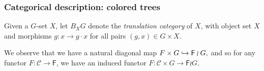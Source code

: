 \documentclass[a4paper,10pt
]{article}%
\renewcommand{\1}{\ensuremath{\mathbb{id}}}
\begin{document}
\subsubsection{Categorical description: colored trees}
\label{COMEGA_SEC}

\begin{definition}
      Given a $G$-set $X$, let $B_XG$ denote the \textit{translation category} of $X$,
      with object set $X$ and morphisms $g: x \to g\cdot x$ for all pairs $(g,x) \in G \times X$.
\end{definition}

\begin{remark}
      We observe that we have a natural diagonal map
      $
      F \times G \hookrightarrow \mathsf F \wr G,
      $
      and so for any functor $F: \mathcal C \to \mathsf F$, we have an induced functor
      $F: \mathcal C \times G \to \mathsf F \wr G$. 
\end{remark}
\end{document}
